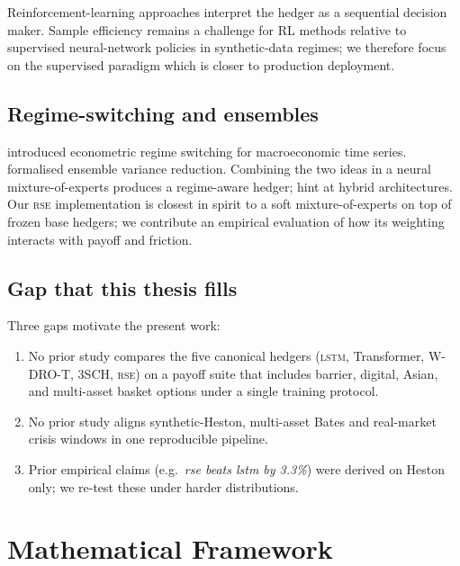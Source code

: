 \documentclass[11pt,a4paper]{article}
\begin{document}
Reinforcement-learning approaches \citep{kolm2019dynamic, cao2021deep,
haarnoja2018soft, neagu2025drl, pickard2025rl, huang2025sac} interpret the
hedger as a sequential decision maker.  Sample efficiency remains a
challenge for RL methods relative to supervised neural-network policies in
synthetic-data regimes; we therefore focus on the supervised paradigm
which is closer to production deployment.

\subsection{Regime-switching and ensembles}

\citet{hamilton1989new} introduced econometric regime switching for
macroeconomic time series.  \citet{dietterich2000ensemble} formalised
ensemble variance reduction.  Combining the two ideas in a neural
mixture-of-experts produces a regime-aware hedger; \citet{tong2023sigformer}
hint at hybrid architectures.  Our \textsc{rse} implementation is closest in
spirit to a soft mixture-of-experts on top of frozen base hedgers; we
contribute an empirical evaluation of how its weighting interacts with
payoff and friction.

\subsection{Gap that this thesis fills}

Three gaps motivate the present work:
\begin{enumerate}[leftmargin=*,label=\textbf{G\arabic*.}]
\item No prior study compares the five canonical hedgers
  (\textsc{lstm}, Transformer, W-DRO-T, 3SCH, \textsc{rse}) on a payoff
  suite that includes barrier, digital, Asian, and multi-asset basket
  options under a single training protocol.
\item No prior study aligns synthetic-Heston, multi-asset Bates and
  real-market crisis windows in one reproducible pipeline.
\item Prior empirical claims (e.g.\ \emph{rse beats lstm by 3.3\%}) were
  derived on Heston only; we re-test these under harder distributions.
\end{enumerate}

\section{Mathematical Framework}\label{sec:math}
\end{document}
